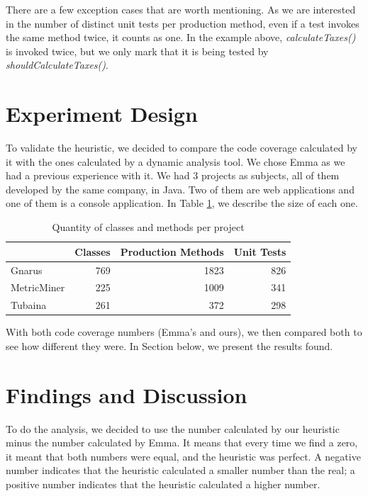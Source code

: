 \documentclass{sig-alternate}
\begin{document}
There are a few exception cases that are worth mentioning. 
As we are
interested in the number of distinct unit tests per production method, even if a test invokes the same method twice, it
counts as one. In the example above, \textit{calculateTaxes()} is invoked twice, but we only mark that it is being
tested by \textit{shouldCalculateTaxes()}.

\section{Experiment Design}

To validate the heuristic, we decided to compare the code coverage calculated by it with the ones 
calculated by a dynamic analysis tool. We chose Emma as we had a previous experience with it. We
had 3 projects as subjects, all of them developed by the same company, in Java. Two of them are
web applications and one of them is a console application. In Table \ref{tab:projects}, we describe
the size of each one.

\begin{table}[h!]
\centering
\caption{Quantity of classes and methods per project}
\begin{tabular}{ | l | r | r | r | }
\hline
& Classes & Production Methods & Unit Tests\\ 
\hline
Gnarus & 769 & 1823 & 826\\ 
MetricMiner & 225 & 1009 & 341\\ 
Tubaina & 261 & 372 & 298\\ 

\hline
\end{tabular}
\label{tab:projects}
\end{table}

With both code coverage numbers (Emma's and ours), we then compared both to see how different
they were. In Section below, we present the results found.

\section{Findings and Discussion}

To do the analysis, we decided to use the number calculated by our heuristic minus the
number calculated by Emma. It means that every time we find a zero, it meant that both numbers
were equal, and the heuristic was perfect. A negative number indicates that the heuristic calculated
a smaller number than the real; a positive number indicates that the heuristic calculated a higher
number.
\end{document}
